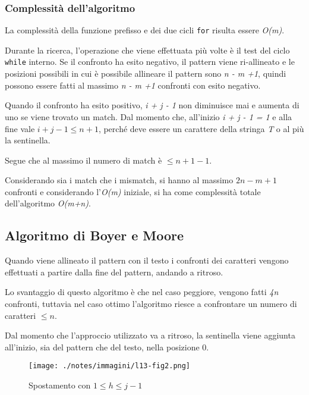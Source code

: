 \subsubsection{Complessità dell'algoritmo}\label{complessituxe0-dellalgoritmo}

La complessità della funzione prefisso e dei due cicli \texttt{for}
risulta essere \emph{O(m)}.

Durante la ricerca, l'operazione che viene effettuata più volte è il test del ciclo \texttt{while} interno. 
Se il confronto ha esito negativo, il pattern viene ri-allineato e le posizioni possibili in cui è possibile allineare il pattern sono \emph{n - m +1}, quindi possono essere fatti al massimo \emph{n - m +1} confronti con esito negativo.

Quando il confronto ha esito positivo, \emph{i + j - 1} non diminuisce mai e aumenta di uno se viene trovato un match. Dal momento che, all'inizio \emph{i + j - 1 = 1} e alla fine vale $i + j -1\leq n+1$, perché
deve essere un carattere della stringa \emph{T} o al più la sentinella.

Segue che al massimo il numero di match è $\leq n + 1 - 1$.

Considerando sia i match che i mismatch, si hanno al massimo $2n-m+1$ confronti e considerando l'\emph{O(m)} iniziale, si ha come
complessità totale dell'algoritmo \emph{O(m+n)}.

\subsection{Algoritmo di Boyer e Moore}\label{algoritmo-di-boyer-e-moore}

Quando viene allineato il pattern con il testo i confronti dei
caratteri vengono effettuati a partire dalla fine del pattern, andando a
ritroso.

Lo svantaggio di questo algoritmo è che nel caso peggiore, vengono fatti
\emph{4n} confronti, tuttavia nel caso ottimo l'algoritmo riesce a
confrontare un numero di caratteri $\leq n$.

Dal momento che l'approccio utilizzato va a ritroso, la sentinella viene
aggiunta all'inizio, sia del pattern che del testo, nella posizione 0.

\begin{figure}[htbp]
\centering
\texttt{[image: ./notes/immagini/l13-fig2.png]}
\caption{Spostamento con $ 1 \leq h \leq j-1 $}
\end{figure}

